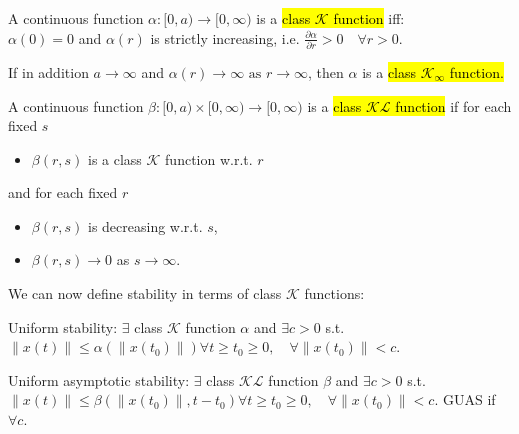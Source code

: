 \begin{definition}
    A continuous function $\alpha:[0, a) \rightarrow[0, \infty)$ is a \hl{class $\mathscr{K}$ function} iff:\\
    $\alpha(0)=0$ and $\alpha(r)$ is strictly increasing, i.e. $\frac{\partial \alpha}{\partial r}>0 \quad \forall r>0$.
\end{definition}
\begin{definition}
    If in addition $a \rightarrow \infty$ and $\alpha(r) \rightarrow \infty \text { as } r \rightarrow \infty$, then $\alpha$ is a \hl{class $\mathscr{K}_\infty$ function.}
\end{definition}
\begin{definition}
    A continuous function $\beta:[0, a) \times[0, \infty) \rightarrow[0, \infty)$
    is a \hl{class $\mathscr{KL}$ function} if for each fixed $s$
    \begin{itemize}[topsep=0pt]
        \item $\beta(r,s)$ is a class $\mathscr{K}$ function w.r.t. $r$
    \end{itemize}
    and for each fixed $r$
    \begin{itemize}[topsep=0pt]
        \item $\beta(r,s)$ is decreasing w.r.t. $s$,
        \item $\beta(r,s) \rightarrow 0$ as $s \rightarrow \infty$.
    \end{itemize}
\end{definition}

We can now define stability in terms of class $\mathscr{K}$ functions:
\begin{definition}
    Uniform stability: $\exists$ class $\mathscr{K}$ function $\alpha$ and $\exists c > 0$ s.t.
    $\|x(t)\| \leq \alpha\left(\left\|x\left(t_{0}\right)\right\|\right) \forall t \geq t_{0} \geq 0, \quad \forall\left\|x\left(t_{0}\right)\right\|<c$.
\end{definition}
\begin{definition}
    Uniform asymptotic stability: $\exists$ class $\mathscr{KL}$ function $\beta$ and $\exists c > 0$ s.t.
    $\|x(t)\| \leq \beta\left(\left\|x\left(t_{0}\right)\right\|, t-t_{0}\right) \forall t \geq t_{0} \geq 0, \quad \forall\left\|x\left(t_{0}\right)\right\|<c$.
    GUAS if $\forall c$.
\end{definition}

